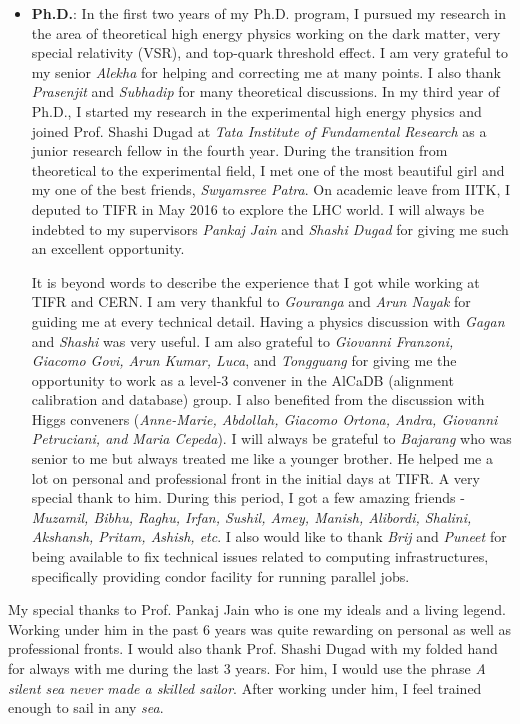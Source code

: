\begin{itemize} [leftmargin=*]
\item \textbf{Ph.D.}: 
In the first two years of my Ph.D. program, I pursued my research in the area
of theoretical high energy physics working on the dark matter, very special
relativity (VSR), and top-quark threshold effect. I am very grateful to my senior
\textit{Alekha} for helping and correcting me at many points. I also thank 
\textit{Prasenjit} and \textit{Subhadip} for many theoretical discussions. In my 
third year of Ph.D., I started my research in the experimental high energy 
physics and joined Prof. Shashi Dugad at \textit{Tata Institute of Fundamental 
Research} as a junior research fellow in the fourth year. During the transition from theoretical 
to the experimental field, I met one of the most beautiful girl and my one of the 
best friends, \textit{Swyamsree Patra}. On academic leave from IITK, I deputed to 
TIFR in May 2016 to explore the LHC world. I will always be indebted to my 
supervisors \textit{Pankaj Jain} and \textit{Shashi Dugad} for giving me such an 
excellent opportunity.

It is beyond words to describe the experience that I got while working at TIFR
and CERN. I am very thankful to \textit{Gouranga} and \textit{Arun Nayak} for 
guiding me at every technical detail. Having a physics discussion with 
\textit{Gagan} and \textit{Shashi} was very useful. I am also grateful to 
\textit{Giovanni Franzoni, Giacomo Govi, Arun Kumar, Luca}, and \textit{Tongguang}
for giving me the opportunity to work as a level-3 convener in the AlCaDB 
(alignment calibration and database) group. I also benefited from the discussion 
with Higgs conveners (\textit{Anne-Marie, Abdollah, Giacomo Ortona, Andra, Giovanni 
Petruciani, and Maria Cepeda}). I will always be grateful to \textit{Bajarang} who was senior to
me but always treated me like a younger brother. He helped me a lot on personal 
and professional front in the initial days at TIFR. A very special thank to him. 
During this period, I got a few amazing friends - \textit{
Muzamil, Bibhu, Raghu, Irfan, Sushil, Amey, Manish, Alibordi, Shalini, Akshansh, Pritam, Ashish, etc}. 
I also would like to thank \textit{Brij} and \textit{Puneet} for being available to fix 
technical issues related to computing infrastructures, specifically providing 
condor facility for running parallel jobs.
\end{itemize}

My special thanks to Prof. Pankaj Jain who is one my ideals and a living legend. 
Working under him in the past 6 years was quite rewarding on personal as well 
as professional fronts. I would also thank Prof. Shashi Dugad with my folded hand 
for always with me during the last 3 years. For him, I would use the phrase 
\textit{A silent sea never made a skilled sailor}. After working under him, I feel 
trained enough to sail in any \textit{sea}.

